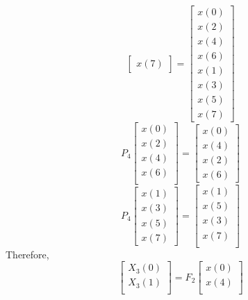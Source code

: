\documentclass[journal,12pt,twocolumn]{IEEEtran}
\renewcommand\thesection{\arabic{section}}
\begin{document}
\begin{enumerate}[label=\arabic*.,ref=\thesection.\theenumi]
\begin{equation}
\begin{bmatrix}
		x(7)
	\end{bmatrix}
	= 
	\begin{bmatrix}
		x(0) \\ 
		x(2) \\ 
		x(4) \\ 
		x(6) \\
		x(1) \\ 
		x(3) \\ 
		x(5) \\
		x(7)
	\end{bmatrix}
\end{equation}
\begin{equation}
	P_{4}
	\begin{bmatrix}
		x(0) \\ 
		x(2) \\ 
		x(4) \\ 
		x(6) \\
	\end{bmatrix}
	= 
	\begin{bmatrix}
		x(0) \\ 
		x(4) \\ 
		x(2) \\
		x(6)
	\end{bmatrix}
\end{equation}
\begin{equation}
	P_{4}
	\begin{bmatrix}
		x(1) \\ 
		x(3) \\ 
		x(5) \\
		x(7)
	\end{bmatrix}
	= 
	\begin{bmatrix}
		x(1) \\ 
		x(5) \\ 
		x(3) \\ 
		x(7) \\
	\end{bmatrix}
\end{equation}
Therefore,
\begin{equation}
	\begin{bmatrix}
		X_{3}(0) \\ 
		X_{3}(1)\\ 
	\end{bmatrix}
	= F_{2}
	\begin{bmatrix}
		x(0) \\ 
		x(4) \\ 
	\end{bmatrix}
\end{equation}
\begin{equation}

\end{equation}
\end{enumerate}
\end{document}
